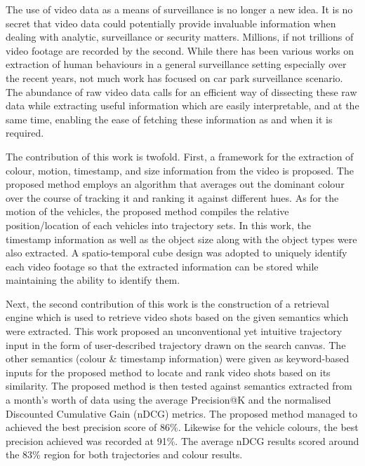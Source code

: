 
The use of video data as a means of surveillance is no longer a new idea. It is no secret that video data could potentially provide invaluable information when dealing with analytic, surveillance or security matters. Millions, if not trillions of video footage are recorded by the second. While there has been various works on extraction of human behaviours in a general surveillance setting especially over the recent years, not much work has focused on car park surveillance scenario. The abundance of raw video data calls for an efficient way of dissecting these raw data while extracting useful information which are easily interpretable, and at the same time, enabling the ease of fetching these information as and when it is required. 

The contribution of this work is twofold. First, a framework for the extraction of colour, motion, timestamp, and size information from the video is proposed. 
The proposed method employs an algorithm that averages out the dominant colour over the course of tracking it and ranking it against different hues. 
As for the motion of the vehicles, the proposed method compiles the relative position/location of each vehicles into trajectory sets. In this work, the timestamp information as well as the object size along with the object types were also extracted. A spatio-temporal cube design was adopted to uniquely identify each video footage so that the extracted information can be stored while maintaining the ability to identify them.  

Next, the second contribution of this work is the construction of a retrieval engine which is used to retrieve video shots based on the given semantics which were extracted. This work proposed an unconventional yet intuitive trajectory input in the form of user-described trajectory drawn on the search canvas. 
The other semantics (colour \& timestamp information) were given as keyword-based inputs for the proposed method to locate and rank video shots based on its similarity. 
The proposed method is then tested against semantics extracted from a month's worth of data 
using the average Precision@K and the normalised Discounted Cumulative Gain (nDCG) metrics. The proposed method managed to achieved the best precision score of 86\%. Likewise for the vehicle colours, the best precision achieved was recorded at 91\%. The average nDCG results scored around the 83\% region for both trajectories and colour results. 


